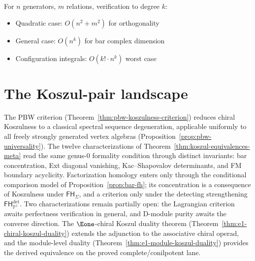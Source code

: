 For $n$ generators, $m$ relations, verification to degree $k$:
\begin{itemize}
\item Quadratic case: $O(n^2 + m^2)$ for orthogonality
\item General case: $O(n^k)$ for bar complex dimension
\item Configuration integrals: $O(k! \cdot n^k)$ worst case
\end{itemize}


\section{The Koszul-pair landscape}

The PBW criterion (Theorem~\ref{thm:pbw-koszulness-criterion})
reduces chiral Koszulness to a classical spectral sequence
degeneration, applicable uniformly to all freely strongly generated
vertex algebras (Proposition~\ref{prop:pbw-universality}). The
twelve characterizations of
Theorem~\ref{thm:koszul-equivalences-meta} read the same
genus-$0$ formality condition through distinct invariants: bar
concentration, Ext diagonal vanishing, Kac--Shapovalov
determinants, and FM boundary acyclicity. Factorization homology
enters only through the conditional comparison model of
Proposition~\ref{prop:bar-fh}; its concentration is a consequence
of Koszulness under $\mathsf{FH}_\Sigma$, and a criterion only under
the detecting strengthening $\mathsf{FH}^{\mathrm{det}}_{\mathbb{P}^1}$.
Two characterizations remain partially open: the Lagrangian
criterion awaits perfectness verification in general, and D-module
purity awaits the converse direction. The $\Eone$-chiral Koszul duality
theorem (Theorem~\ref{thm:e1-chiral-koszul-duality}) extends the
adjunction to the associative chiral operad, and the module-level
duality (Theorem~\ref{thm:e1-module-koszul-duality}) provides the
derived equivalence on the proved complete/conilpotent lane.

